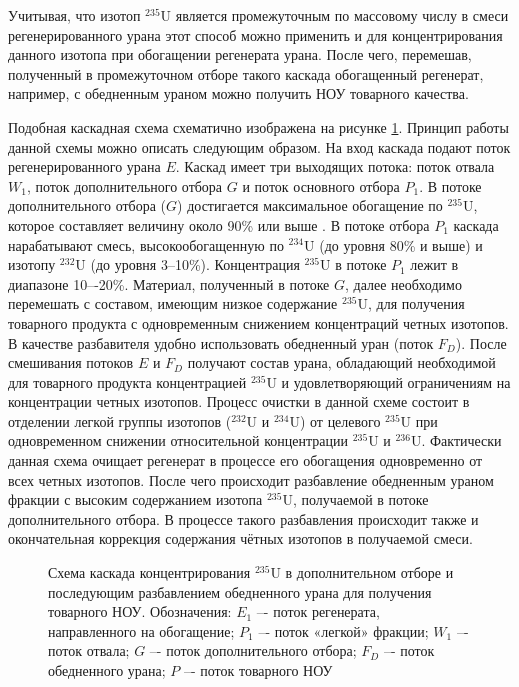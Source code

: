 Учитывая, что изотоп $^{235}$U является промежуточным по массовому числу в смеси регенерированного урана этот способ можно применить и для концентрирования данного изотопа при обогащении регенерата урана. После чего, перемешав, полученный в промежуточном отборе такого каскада обогащенный регенерат, например, с обедненным ураном можно получить НОУ товарного качества.

Подобная каскадная схема схематично изображена на рисунке \ref{fig:enl}. Принцип работы данной схемы можно описать следующим образом. На вход каскада подают поток регенерированного урана $E$. Каскад имеет три выходящих потока: поток отвала $W_1$, поток дополнительного отбора $G$ и поток основного отбора $P_1$. В потоке дополнительного отбора ($G$) достигается максимальное обогащение по $^{235}$U, которое составляет величину около 90\% или выше \cite{palkinRestorationIsotopicComposition2020}. В потоке отбора $P_1$ каскада нарабатывают смесь, высокообогащенную по $^{234}$U (до уровня 80\% и выше) и изотопу $^{232}$U (до уровня 3--10\%). Концентрация $^{235}$U в потоке $P_1$ лежит в диапазоне 10–-20\%. Материал, полученный в потоке $G$, далее необходимо перемешать с составом, имеющим низкое содержание $^{235}$U, для получения товарного продукта с одновременным снижением концентраций четных изотопов. В качестве разбавителя удобно использовать обедненный уран (поток $F_D$). После смешивания потоков $E$ и $F_D$ получают состав урана, обладающий необходимой для товарного продукта концентрацией $^{235}$U и удовлетворяющий ограничениям на концентрации четных изотопов.
Процесс очистки в данной схеме состоит в отделении легкой группы изотопов ($^{232}$U и $^{234}$U) от целевого $^{235}$U при одновременном снижении относительной концентрации $^{235}$U и $^{236}$U. Фактически данная схема очищает регенерат в процессе его обогащения одновременно от всех четных изотопов. После чего происходит разбавление обедненным ураном фракции с высоким содержанием изотопа $^{235}$U, получаемой в потоке дополнительного отбора. В процессе такого разбавления происходит также и окончательная коррекция содержания чётных изотопов в получаемой смеси.

\begin{figure}[ht]
  \caption{Схема каскада концентрирования $^{235}$U в дополнительном отборе и последующим разбавлением обедненного урана для получения товарного НОУ. Обозначения: $E_1$ –- поток регенерата, направленного на обогащение; $P_1$ –- поток «легкой» фракции; $W_1$ –- поток отвала; $G$ –- поток дополнительного отбора; $F_D$ –- поток обедненного урана; $P$ –- поток товарного НОУ
  }\label{fig:enl}
\end{figure}

